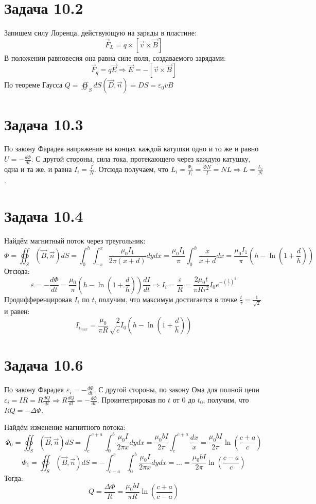 \documentclass[11pt]{article}
\author{Sergey Makarov}
\date{\today}
\title{}
\begin{document}
\section{Задача 10.2}
\label{sec:orgbaf0fef}
Запишем силу Лоренца, действующую на заряды в пластине:
$$\vec F_{L} = q \times [\vec v \times \vec B]$$
В положении равновесия она равна силе поля, создаваемого зарядами:
$$\vec F_q = q\vec E \Rightarrow \vec E = -[\vec v \times \vec B]$$
По теореме Гаусса \(Q = \oiint_SdS (\vec D, \vec n) = DS = \varepsilon_0vB\)
\section{Задача 10.3}
\label{sec:org626110a}
По закону Фарадея напряжение на концах каждой катушки одно и то же и равно \(U = -\frac{d\Phi}{dt}\).
С другой стороны, сила тока, протекающего через каждую катушку, одна и та же, и равна \(I_i = \frac{I}{N}\).
Отсюда получаем, что \(L_i = \frac{\Phi_i}{I_i} = \frac{\Phi N}{I} = NL \Rightarrow L = \frac{L_i}{N}\).
\section{Задача 10.4}
\label{sec:orga9e30b9}
Найдём магнитный поток через треугольник:
$$\Phi = \oiint_S (\vec B, \vec n)dS = \int_0^h \int_{-x}^x \frac{\mu_0 I_1}{2\pi(x + d)}dydx = \frac{\mu_0 I_1}{\pi}\int_0^h \frac{x}{x + d}dx = \frac{\mu_0 I_1}{\pi}\left(h - \ln\left(1 + \frac{d}{h}\right)\right)$$
Отсюда:
$$\varepsilon = -\frac{d\Phi}{dt} = \frac{\mu_0}{\pi}\left(h - \ln\left(1 + \frac{d}{h}\right)\right)\frac{dI}{dt} \Rightarrow I_{i} = \frac{\varepsilon}{R} = \frac{2\mu_0t}{\pi R\tau^2}I_0e^{-\left(\frac{t}{\tau}\right)^2}$$
Продифференцировав \(I_i\) по \(t\), получим, что максимум достигается в точке \(\frac{t}{\tau} = \frac{1}{\sqrt 2}\) и равен:
$$I_{i_{max}} = \frac{\mu_0}{\pi R}\sqrt \frac{2}{e} I_0\left(h - \ln\left(1 + \frac{d}{h}\right)\right)$$
\section{Задача 10.6}
\label{sec:orge51a9cc}
По закону Фарадея \(\varepsilon_i = -\frac{d\Phi}{dt}\). С другой стороны, по закону Ома для полной цепи \(\varepsilon_i = IR = R\frac{dQ}{dt} \Rightarrow R\frac{dQ}{dt} = -\frac{d\Phi}{dt}\). Проинтегрировав по \(t\) от \(0\) до \(t_0\), получим, что \(RQ = -\Delta\Phi\).

Найдём изменение магнитного потока:
$$\Phi_0 = \oiint_S (\vec B, \vec n)dS = \int_c^{c + a} \int_0^b \frac{\mu_0 I}{2\pi x}dydx = \frac{\mu_0 bI}{2\pi}\int_c^{c + a} \frac{dx}{x} = \frac{\mu_0 bI}{2\pi}\ln\left(\frac{c + a}{c}\right)$$
$$\Phi_1 = \oiint_S (\vec B, \vec n)dS = -\int_{c - a}^c \int_0^b \frac{\mu_0 I}{2\pi x}dydx = \ldots = \frac{\mu_0 bI}{2\pi}\ln\left(\frac{c - a}{c}\right)$$
Тогда:
$$Q = \frac{\Delta\Phi}{R} = \frac{\mu_0 bI}{\pi R}\ln\left(\frac{c + a}{c - a}\right)$$
\end{document}

